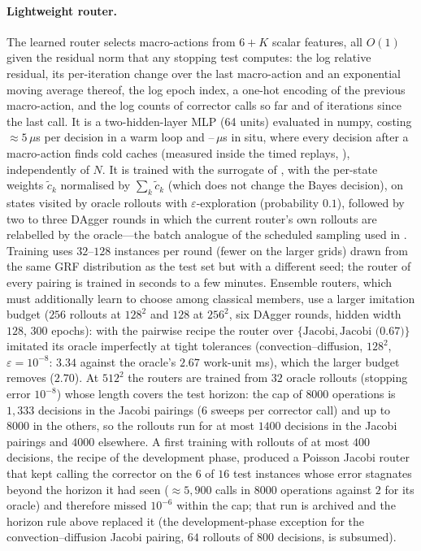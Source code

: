 \paragraph{Lightweight router.} The learned router selects macro-actions from $6 + K$ scalar features, all $O(1)$ given the residual norm that any stopping test computes: the log relative residual, its per-iteration change over the last macro-action and an exponential moving average thereof, the log epoch index, a one-hot encoding of the previous macro-action, and the log counts of corrector calls so far and of iterations since the last call. It is a two-hidden-layer MLP (64 units) evaluated in numpy, costing $\approx 5\,\mu$s per decision in a warm loop and \caDecInSituMin--\caDecInSituMax\,$\mu$s in situ, where every decision after a macro-action finds cold caches (measured inside the timed replays, ), independently of $N$. It is trained with the surrogate of , with the per-state weights $\tilde c_k$ normalised by $\sum_k \tilde c_k$ (which does not change the Bayes decision), on states visited by oracle rollouts with $\varepsilon$-exploration (probability $0.1$), followed by two to three DAgger rounds \citep{ross2011reduction} in which the current router's own rollouts are relabelled by the oracle---the batch analogue of the scheduled sampling used in . Training uses $32$--$128$ instances per round (fewer on the larger grids) drawn from the same GRF distribution as the test set but with a different seed; the router of every pairing is trained in seconds to a few minutes. Ensemble routers, which must additionally learn to choose among classical members, use a larger imitation budget ($256$ rollouts at $128^2$ and $128$ at $256^2$, six DAgger rounds, hidden width $128$, $300$ epochs): with the pairwise recipe the router over $\{\text{Jacobi}, \text{Jacobi (0.67)}\}$ imitated its oracle imperfectly at tight tolerances (convection--diffusion, $128^2$, $\varepsilon = 10^{-8}$: $3.34$ against the oracle's $2.67$ work-unit ms), which the larger budget removes ($2.70$). At $512^2$ the routers are trained from $32$ oracle rollouts (stopping error $10^{-8}$) whose length covers the test horizon: the cap of $8000$ operations is $1{,}333$ decisions in the Jacobi pairings ($6$ sweeps per corrector call) and up to $8000$ in the others, so the rollouts run for at most $1400$ decisions in the Jacobi pairings and $4000$ elsewhere. A first training with rollouts of at most $400$ decisions, the recipe of the development phase, produced a Poisson Jacobi router that kept calling the corrector on the $6$ of $16$ test instances whose error stagnates beyond the horizon it had seen ($\approx 5{,}900$ calls in $8000$ operations against $2$ for its oracle) and therefore missed $10^{-6}$ within the cap; that run is archived and the horizon rule above replaced it (the development-phase exception for the convection--diffusion Jacobi pairing, $64$ rollouts of $800$ decisions, is subsumed).

